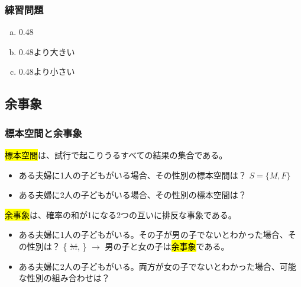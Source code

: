 
\begin{frame}
\frametitle{練習問題}


\begin{enumerate}[(a)]
\item 0.48
\item 0.48より大きい
\item 0.48より小さい
\end{enumerate}


\end{frame}


\subsection{余事象}


\begin{frame}
\frametitle{標本空間と余事象}

\hl{標本空間}は、試行で起こりうるすべての結果の集合である。

\begin{itemize}
\item ある夫婦に1人の子どもがいる場合、その性別の標本空間は？ $S = \{ M, F \}$
\item ある夫婦に2人の子どもがいる場合、その性別の標本空間は？ 
\end{itemize}

\hl{余事象}は、確率の和が1になる2つの互いに排反な事象である。

\begin{itemize}
\item ある夫婦に1人の子どもがいる。その子が男の子でないとわかった場合、その性別は？
\{ \sout{\textcolor{gray}{M}},  \} $\rightarrow$ 男の子と女の子は\hl{余事象}である。
\item ある夫婦に2人の子どもがいる。両方が女の子でないとわかった場合、可能な性別の組み合わせは？
\end{itemize}

\end{frame}

